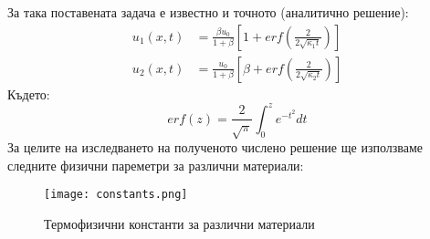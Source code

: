 За така поставената задача е известно и точното (аналитично решение):
\begin{align}
	u_{1}(x, t) & = \frac{\beta u_0}{1+\beta} \left[1 + erf(\frac{2}{2\sqrt{\kappa_1 t}})\right] \\
	u_{2}(x, t) & = \frac{u_0}{1+\beta} \left[\beta + erf(\frac{2}{2\sqrt{\kappa_2 t}})\right]   
\end{align}
Където: 
\begin{equation*}
	erf(z) = \frac{2}{\sqrt{\pi}} \displaystyle\int_{0}^{z} e ^{-t^2} dt
\end{equation*}
За целите на изследването на полученото числено решение ще използваме следните физични пареметри за различни материали:\\
\begin{figure}[h]
	\centering
	\texttt{[image: constants.png]}
	\caption{Термофизични константи за различни материали}
	\label{fig:constants}
\end{figure}

